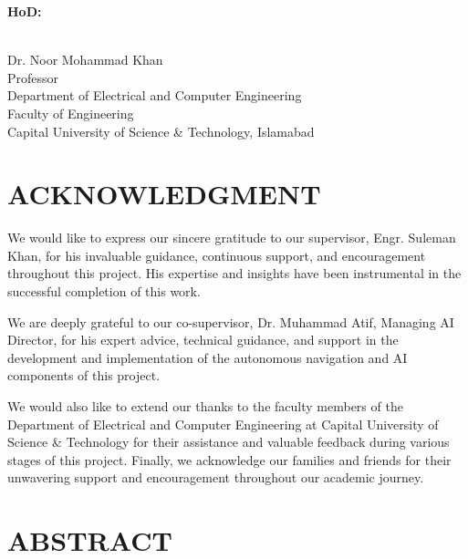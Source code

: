 \documentclass[12pt,a4paper]{report}
\newcommand{\supervisorname}{Engr. Suleman Khan}
\newcommand{\cosupervisorname}{Dr. Muhammad Atif}
\newcommand{\hodname}{Dr. Noor Mohammad Khan}
\newcommand{\hodtitle}{Professor}
\begin{document}
	\noindent\textbf{HoD:}
	\begin{center}
		\makebox[7cm]{\dotfill} \\
		\hodname \\
		\hodtitle \\
		Department of Electrical and Computer Engineering \\
		Faculty of Engineering \\
		Capital University of Science \& Technology, Islamabad
	\end{center}
	\clearpage
	
	\chapter*{ACKNOWLEDGMENT}
	\thispagestyle{plain}
	
	We would like to express our sincere gratitude to our supervisor, \supervisorname, for his invaluable guidance, continuous support, and encouragement throughout this project. His expertise and insights have been instrumental in the successful completion of this work.
	
	We are deeply grateful to our co-supervisor, \cosupervisorname, Managing AI Director, for his expert advice, technical guidance, and support in the development and implementation of the autonomous navigation and AI components of this project.
	
	We would also like to extend our thanks to the faculty members of the Department of Electrical and Computer Engineering at Capital University of Science \& Technology for their assistance and valuable feedback during various stages of this project. Finally, we acknowledge our families and friends for their unwavering support and encouragement throughout our academic journey.
	\clearpage
	
	\chapter*{ABSTRACT}
	\thispagestyle{plain}
\end{document}
